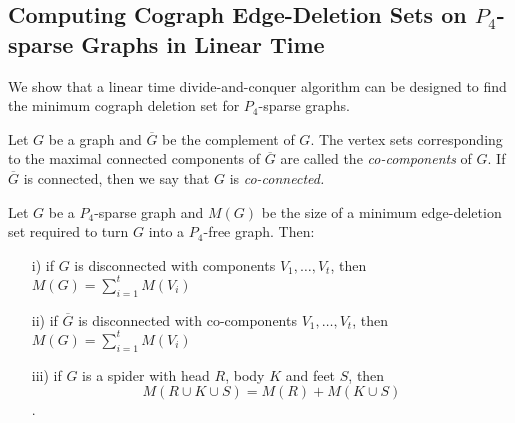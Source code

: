 \documentclass{llncs}
\begin{document}
\subsection{Computing Cograph Edge-Deletion Sets on $P_4$-sparse Graphs in Linear Time}

We show that a linear time divide-and-conquer algorithm can be designed to find the minimum cograph deletion set for $P_4$-sparse graphs.

\begin{definition}
Let $G$ be a graph and $\overline{G}$ be the complement of $G$. The vertex sets corresponding to the maximal connected components of $\overline{G}$ are called the \emph{co-components} of $G$. If $\overline{G}$ is connected, then we say that $G$ is \emph{co-connected.}
\end{definition}

\begin{proposition}\label{prop:decomposition}
 Let $G$ be a $P_4$-sparse graph and $M(G)$ be the size of a minimum edge-deletion set required to turn $G$ into a $P_4$-free graph. Then:
 \begin{itemize}
 \item[i)] if $G$ is disconnected with components $V_1, \ldots , V_t$, then $M(G) = \sum_{i=1}^t M(V_i)$
 \item[ii)] if $\overline{G}$ is disconnected with co-components $V_1, \ldots , V_t$, then $M(G) = \sum_{i=1}^t M(V_i)$
 \item[iii)] if $G$ is a spider with head $R$, body $K$ and feet $S$, then $$M(R\cup K\cup S) = M(R) + M(K\cup S)$$.
 \end{itemize}
\end{proposition}
\end{document}

